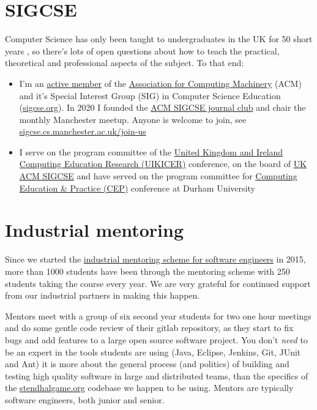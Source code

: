\documentclass[
  12pt,
]{book}
\providecommand{\tightlist}{%
  \setlength{\itemsep}{0pt}\setlength{\parskip}{0pt}}
\begin{document}
\hypertarget{sigcse}{%
\section{SIGCSE}\label{sigcse}}

Computer Science has only been taught to undergraduates in the UK for 50 short years \citep{babygrowsup, sigcse50}, so there's lots of open questions about how to teach the practical, theoretical and professional aspects of the subject. To that end:

\begin{itemize}
\tightlist
\item
  I'm an \href{https://dl.acm.org/profile/81350580198}{active member} of the \href{https://en.wikipedia.org/wiki/Association_for_Computing_Machinery}{Association for Computing Machinery} (ACM) and it's Special Interest Group (SIG) in Computer Science Education (\href{https://sigcse.org}{sigcse.org}). In 2020 I founded the \href{https://sigcse.cs.manchester.ac.uk/}{ACM SIGCSE journal club} and chair the monthly Manchester meetup. Anyone is welcome to join, see \href{https://sigcse.cs.manchester.ac.uk/join-us}{sigcse.cs.manchester.ac.uk/join-us}
\item
  I serve on the program committee of the \href{https://www.ukicer.com/}{United Kingdom and Ireland Computing Education Research (UIKICER)} conference, on the board of \href{https://uki-sigcse.acm.org/about}{UK ACM SIGCSE} and have served on the program committee for \href{http://community.dur.ac.uk/cep.conference}{Computing Education \& Practice (CEP)} conference at Durham University
\end{itemize}

\hypertarget{industrial-mentoring}{%
\section{Industrial mentoring}\label{industrial-mentoring}}

Since we started the \href{https://www.cs.manchester.ac.uk/connect/business-engagement/industrial-mentoring/}{industrial mentoring scheme for software engineers} in 2015, more than 1000 students have been through the mentoring scheme with 250 students taking the course every year. We are very grateful for continued support from our industrial partners in making this happen.

Mentors meet with a group of six second year students for two one hour meetings and do some gentle code review of their gitlab repository, as they start to fix bugs and add features to a large open source software project. You don't \emph{need} to be an expert in the tools students are using (Java, Eclipse, Jenkins, Git, JUnit and Ant) it is more about the general process (and politics) of building and testing high quality software in large and distributed teams, than the specifics of the \href{https://stendhalgame.org/}{stendhalgame.org} codebase we happen to be using. Mentors are typically software engineers, both junior and senior.
\end{document}
